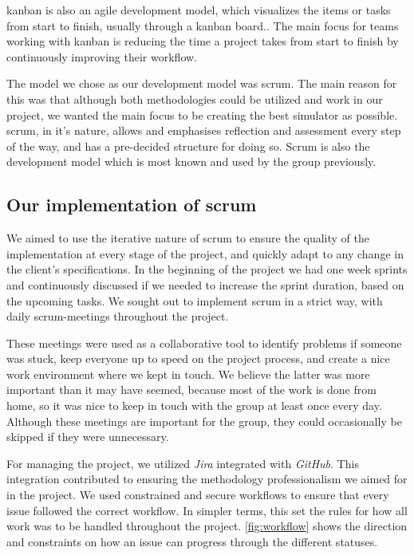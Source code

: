 \Gls{kanban} is also an agile development model, which visualizes the items or tasks from start to finish, usually through a \Gls{kanban} board.\cite{kanban_2022}. The main focus for teams working with \Gls{kanban} is reducing the time a project takes from start to finish by continuously improving their workflow.

The model we chose as our development model was \Gls{scrum}. The main reason for this was that although both methodologies could be utilized and work in our project, we wanted the main focus to be creating the best simulator as possible. \Gls{scrum}, in it's nature, allows and emphasises reflection and assessment every step of the way, and has a pre-decided structure for doing so. Scrum is also the development model which is most known and used by the group previously.  

\subsection{Our implementation of \Gls{scrum}}
We aimed to use the iterative nature of \Gls{scrum} to ensure the quality of the implementation at every stage of the project, and quickly adapt to any change in the client's specifications. In the beginning of the project we had one week \gls{sprint}s and continuously discussed if we needed to increase the \gls{sprint} duration, based on the upcoming tasks. We sought out to implement \Gls{scrum} in a strict way, with daily \Gls{scrum}-meetings throughout the project.

These meetings were used as a collaborative tool to identify problems if someone was stuck, keep everyone up to speed on the project process, and create a nice work environment where we kept in touch. We believe the latter was more important than it may have seemed, because most of the work is done from home, so it was nice to keep in touch with the group at least once every day. Although these meetings are important for the group, they could occasionally be skipped if they were unnecessary. 

For managing the project, we utilized \textit{Jira} integrated with \textit{GitHub}. This integration contributed to ensuring the methodology professionalism we aimed for in the project. We used constrained and secure workflows to ensure that every issue followed the correct workflow. In simpler terms, this set the rules for how all work was to be handled throughout the project. \ref{fig:workflow} shows the direction and constraints on how an issue can progress through the different statuses.


